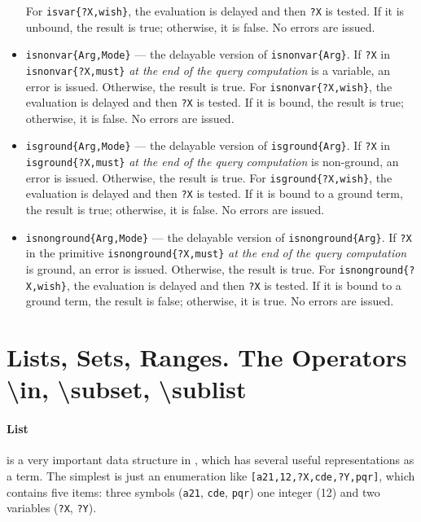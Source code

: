 \documentclass[11pt]{article}
\newcommand{\ERGO}{\mbox{\smaller{\ensuremath{\cal{E}}\smaller{{\sc{RGO}}}}}\xspace}
\newcommand{\FLSYSTEM}{\ERGO}
\newcommand{\bs}{\textbackslash}
\begin{document}
\begin{itemize}
  For \texttt{isvar\{?X,wish\}}, the
  evaluation is delayed and then \texttt{?X} is tested. If it is unbound,
  the result is true; otherwise, it is false. No errors are issued. 
\item \texttt{isnonvar\{Arg,Mode\}} --- the delayable version of
  \texttt{isnonvar\{Arg\}}.  If \texttt{?X} in
  \texttt{isnonvar\{?X,must\}} \emph{at the end of the query computation} is a
  variable, an error is issued. Otherwise, the result is true.
  For \texttt{isnonvar\{?X,wish\}}, the evaluation is delayed and then
  \texttt{?X} is tested. If it is bound, the result is true; otherwise,
  it is false. No errors are issued.
\item \texttt{isground\{Arg,Mode\}} --- the delayable version of
  \texttt{isground\{Arg\}}.  If \texttt{?X} in
  \texttt{isground\{?X,must\}} \emph{at the end of the query computation}
  is non-ground, an error is issued. Otherwise, the result is true.
  For \texttt{isground\{?X,wish\}}, the
  evaluation is delayed and then \texttt{?X} is tested. If it is bound to a
  ground term, the result is true; otherwise, it is false. No errors are
  issued.
\item \texttt{isnonground\{Arg,Mode\}} --- the delayable version of
  \texttt{isnonground\{Arg\}}.  If \texttt{?X} in the primitive
  \texttt{isnonground\{?X,must\}} \emph{at the end of the query computation}
  is ground, an error is issued. Otherwise, the result is true.
  For \texttt{isnonground\{?X,wish\}}, the
  evaluation is delayed and then \texttt{?X} is tested. If it is bound to a
  ground term, the result is false; otherwise, it is true. No errors are
  issued.
\end{itemize}


\section{Lists, Sets, Ranges. The Operators \bs{}in, \bs{}subset, \bs{}sublist}
\label{sec-ranges-lists}

\paragraph{List} is a very important data structure in \FLSYSTEM, which has
several useful representations as a term. The simplest is just an
enumeration like \texttt{[a21,12,?X,cde,?Y,pqr]}, which contains  five
items: three
symbols (\texttt{a21}, \texttt{cde}, \texttt{pqr}) one integer (12) and two variables
(\texttt{?X}, \texttt{?Y}).
\end{document}
